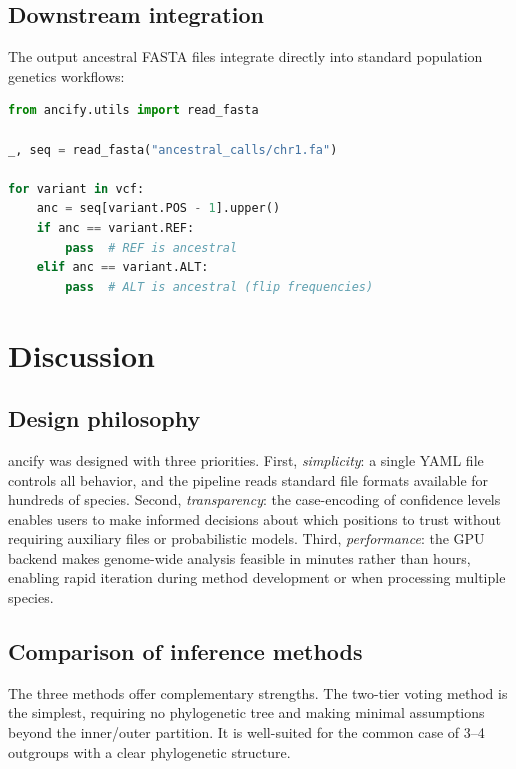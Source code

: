 \documentclass[11pt,a4paper]{article}
\begin{document}
\subsection{Downstream integration}

The output ancestral FASTA files integrate directly into standard population
genetics workflows:

\begin{lstlisting}[language=Python,caption={Polarizing a VCF using ancify
output.},label={lst:polarize}]
from ancify.utils import read_fasta

_, seq = read_fasta("ancestral_calls/chr1.fa")

for variant in vcf:
    anc = seq[variant.POS - 1].upper()
    if anc == variant.REF:
        pass  # REF is ancestral
    elif anc == variant.ALT:
        pass  # ALT is ancestral (flip frequencies)
\end{lstlisting}

\section{Discussion}
\label{sec:discussion}

\subsection{Design philosophy}

ancify was designed with three priorities. First, \emph{simplicity}: a single
YAML file controls all behavior, and the pipeline reads standard file formats
available for hundreds of species. Second, \emph{transparency}: the
case-encoding of confidence levels enables users to make informed decisions
about which positions to trust without requiring auxiliary files or
probabilistic models. Third, \emph{performance}: the GPU backend makes
genome-wide analysis feasible in minutes rather than hours, enabling rapid
iteration during method development or when processing multiple species.

\subsection{Comparison of inference methods}

The three methods offer complementary strengths. The two-tier voting method
is the simplest, requiring no phylogenetic tree and making minimal assumptions
beyond the inner/outer partition. It is well-suited for the common case of
3--4 outgroups with a clear phylogenetic structure.
\end{document}
